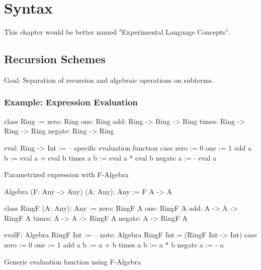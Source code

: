 \section{Syntax}

This chapter would be better named "Experimental Language Concepts".





\subsection{Recursion Schemes}

Goal: Separation of recursion and algebraic operations on subterms.

\subsubsection{Example: Expression Evaluation}

\begin{alba}
    class Ring :=
        zero:   Ring
        one:    Ring
        add:    Ring -> Ring -> Ring
        times:  Ring -> Ring -> Ring
        negate: Ring -> Ring

    eval: Ring -> Int :=
            -- specific evaluation function
        case
            zero :=
                0
            one  :=
                1
            add a b :=
                eval a + eval b
            times a b :=
                eval a * eval b
            negate a :=
                - eval a
\end{alba}



\noindent Parametrized expression with F-Algebra

\begin{alba}
    Algebra (F: Any -> Any) (A: Any): Any :=
        F A -> A

    class RingF  (A: Any): Any :=
        zero:   RingF A
        one:    RingF A
        add:    A -> A -> RingF A
        times:  A -> A -> RingF A
        negate: A -> RingF A

    evalF: Algebra RingF Int :=
        -- note: Algebra RingF Int = (RingF Int -> Int)
        case
            zero :=
                0
            one :=
                1
            add a b :=
                a + b
            times a b :=
                a * b
            negate a :=
                - a
\end{alba}

\noindent Generic evaluation function using F-Algebra

